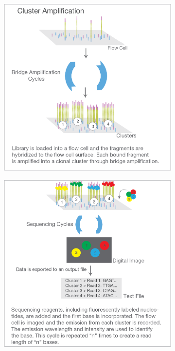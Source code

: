 \begin{figure}[htb]
    \centering
    \hspace{0.5cm}%
    \begin{subfigure}{0.45\textwidth}
        \includegraphics[width=\linewidth,keepaspectratio]{images/intro/illumina_seq_cluster}
        \caption{}\label{fig:intro:illumina_seq_cluster}
    \end{subfigure}%
    \hfill%
    \begin{subfigure}{0.45\textwidth}
        \includegraphics[width=\linewidth,keepaspectratio]{images/intro/illumina_seq_seq}

\end{subfigure}
\end{figure}
